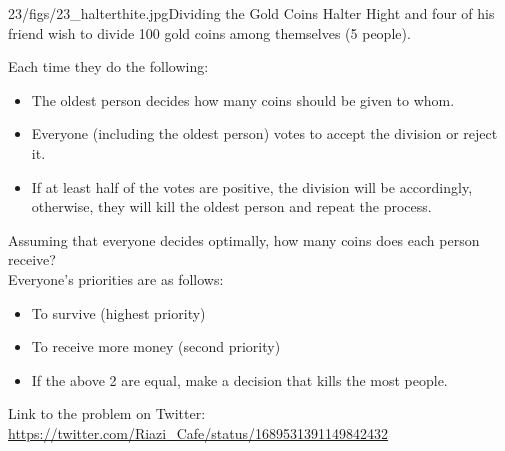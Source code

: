 \begin{problem}{23/figs/23_halterthite.jpg}{Dividing the Gold Coins}
Halter Hight and four of his friend wish to divide 100 gold coins among themselves (5 people).

Each time they do the following:
\begin{itemize}
\item The oldest person decides how many coins should be given to whom.
\item Everyone (including the oldest person) votes to accept the division or reject it.
\item If at least half of the votes are positive, the division will be accordingly, otherwise, they will kill the oldest person and repeat the process.
\end{itemize}
Assuming that everyone decides optimally, how many coins does each person receive?\\[0.2cm]

Everyone's priorities are as follows:
\begin{itemize}
\item To survive (highest priority)
\item To receive more money (second priority)
\item If the above 2 are equal, make a decision that kills the most people.
\end{itemize}

Link to the problem on Twitter:  \url{https://twitter.com/Riazi_Cafe/status/1689531391149842432}\end{problem}